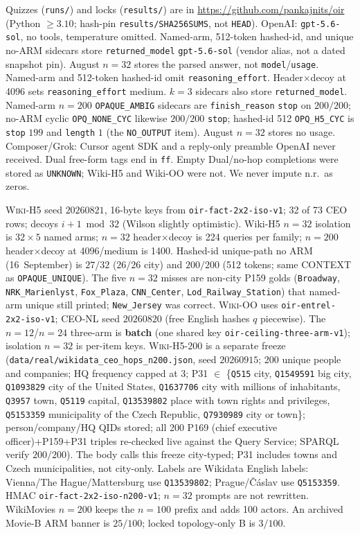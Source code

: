 \documentclass[10pt]{article} %
\begin{document}
Quizzes (\texttt{runs/}) and locks (\texttt{results/}) are in
\url{https://github.com/pankajnits/oir}
(Python $\ge 3.10$; hash-pin \texttt{results/SHA256SUMS}, not \texttt{HEAD}).
OpenAI: \texttt{gpt-5.6-sol}, no tools, temperature omitted.
Named-arm, 512-token hashed-id, and unique no-ARM sidecars store
\texttt{returned\_model} \texttt{gpt-5.6-sol} (vendor alias, not a dated
snapshot pin). August $n{=}32$ stores the parsed answer, not
\texttt{model}/\texttt{usage}.
Named-arm and 512-token hashed-id omit \texttt{reasoning\_effort}.
Header$\times$decoy at 4096 sets \texttt{reasoning\_effort} medium.
$k{=}3$ sidecars also store \texttt{returned\_model}.
Named-arm $n{=}200$ \texttt{OPAQUE\_AMBIG} sidecars are
\texttt{finish\_reason} \texttt{stop} on $200/200$; no-ARM cyclic
\texttt{OPQ\_NONE\_CYC} likewise $200/200$ \texttt{stop}; hashed-id 512
\texttt{OPQ\_H5\_CYC} is \texttt{stop} $199$ and \texttt{length} $1$
(the \texttt{NO\_OUTPUT} item). August $n{=}32$ stores no usage.
Composer/Grok: Cursor agent SDK and a reply-only preamble OpenAI never
received. Dual free-form tags end in \texttt{ff}.
Empty Dual/no-hop completions were stored as \texttt{UNKNOWN}; Wiki-H5 and
Wiki-OO were not. We never impute n.r.\ as zeros.

\textsc{Wiki-H5} seed $20260821$, 16-byte keys from \texttt{oir-fact-2x2-iso-v1};
32 of 73 CEO rows; decoys $i{+}1 \bmod 32$ (Wilson slightly optimistic).
Wiki-H5 $n{=}32$ isolation is $32{\times}5$ named arms; $n{=}32$
header$\times$decoy is 224 queries per family; $n{=}200$ header$\times$decoy
at 4096/medium is 1400.
Hashed-id unique-path no ARM (16~September) is $27/32$ ($26/26$ city) and
$200/200$ (512 tokens; same CONTEXT as \texttt{OPAQUE\_UNIQUE}).
The five $n{=}32$ misses are non-city P159 golds
(\texttt{Broadway}, \texttt{NRK\_Marienlyst}, \texttt{Fox\_Plaza},
\texttt{CNN\_Center}, \texttt{Lod\_Railway\_Station}) that named-arm unique
still printed; \texttt{New\_Jersey} was correct.
\textsc{Wiki-OO} uses \texttt{oir-entrel-2x2-iso-v1}; CEO-NL seed $20260820$
(free English hashes $q$ piecewise).
The $n{=}12$/$n{=}24$ three-arm is \textbf{batch} (one shared key
\texttt{oir-ceiling-three-arm-v1}); isolation $n{=}32$ is per-item keys.
\textsc{Wiki-H5-200} is a separate freeze
(\texttt{data/real/wikidata\_ceo\_hops\_n200.json}, seed $20260915$;
200 unique people and companies; HQ frequency capped at 3;
P31 $\in$ \{\texttt{Q515} city, \texttt{Q1549591} big city,
\texttt{Q1093829} city of the United States,
\texttt{Q1637706} city with millions of inhabitants,
\texttt{Q3957} town, \texttt{Q5119} capital,
\texttt{Q13539802} place with town rights and privileges,
\texttt{Q5153359} municipality of the Czech Republic,
\texttt{Q7930989} city or town\};
person/company/HQ QIDs stored;
all 200 P169 (chief executive officer)+P159+P31 triples re-checked live
against the Query Service; SPARQL verify $200/200$).
The body calls this freeze city-typed; P31 includes towns and Czech
municipalities, not city-only.
Labels are Wikidata English labels: Vienna/The Hague/Mattersburg use
\texttt{Q13539802}; Prague/\v{C}\'aslav use \texttt{Q5153359}.
HMAC \texttt{oir-fact-2x2-iso-n200-v1};
$n{=}32$ prompts are not rewritten.
WikiMovies $n{=}200$ keeps the $n{=}100$ prefix and adds 100 actors.
An archived Movie-B ARM banner is $25/100$; locked topology-only B is
$3/100$.
\end{document}
